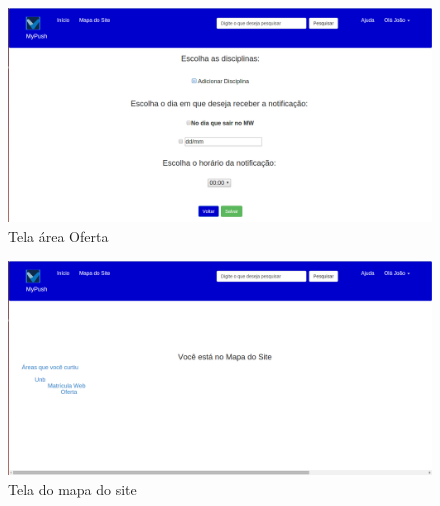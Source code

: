   \begin{figure}[h!]
  \centering
    \includegraphics[keepaspectratio=true, scale=0.35]{figuras/tela4.png}
  \caption{Tela área Oferta}
\end{figure}

  \begin{figure}[h!]
  \centering
    \includegraphics[keepaspectratio=true, scale=0.35]{figuras/tela5.png}
  \caption{Tela do mapa do site}
\end{figure}
